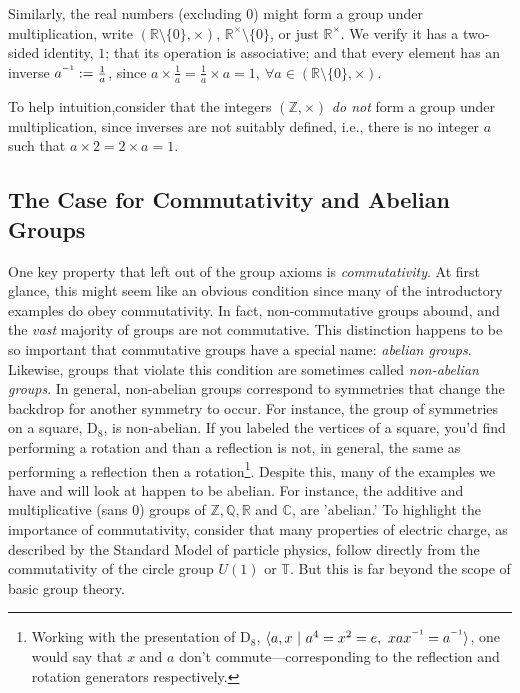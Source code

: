 \documentclass[11pt, a4paper]{report}
\newcommand{\inv}{^{\raisebox{.2em}{$\scriptscriptstyle-1$}}}
\newcommand{\integers}{\mathbb{Z}}
\newcommand{\rationals}{\mathbb{Q}}
\newcommand{\reals}{\mathbb{R}}
\newcommand{\complexes}{\mathbb{C}}
\begin{document}
 Similarly, the real numbers (excluding 0) might form a group under multiplication, write $(\reals\setminus\lbrace 0 \rbrace, \times)$, $\reals^{\times}\setminus\lbrace 0 \rbrace$, or just $\reals^{\times}$. 
We verify it has a two-sided identity, $1$; that its operation is associative; and that every element has an inverse $a\inv := \frac{1}{a}$, since $a\times \frac{1}{a} = \frac{1}{a} \times a = 1, \ \forall  a \in  (\reals\setminus\lbrace 0 \rbrace, \times)$. 
 
 To help intuition,consider that the integers $(\mathbb{Z},\times)$  \textit{do not} form a group under multiplication, since inverses are not suitably defined, i.e., there is no integer $a$ such that $a\times 2 = 2 \times a = 1$.

\subsection{The Case for Commutativity and Abelian Groups}
One key property that left out of the group axioms is \textit{commutativity}. At first glance, this might seem like an obvious condition since many of the introductory examples do obey commutativity. In fact, non-commutative groups abound, and the \textit{vast} majority of groups are not commutative.\autocite{aschbacher} This distinction happens to be so important that commutative groups have a special name: \textit{abelian groups}.\autocite[17]{dummit} Likewise, groups that violate this condition are sometimes called \textit{non-abelian groups}. In general, non-abelian groups correspond to symmetries that change the backdrop for another symmetry to occur. For instance, the group of symmetries on a square, $\mathrm{D}_{8}$, is non-abelian. If you labeled the vertices of a square, you'd find performing a rotation and than a reflection is not, in general, the same as performing a reflection then a rotation\footnote{Working with the presentation of $\mathrm{D}_8$, $\langle a,x\ \vert \ a^4 = x^2 = e,\ xax\inv = a\inv \rangle$, one would say that $x$ and $a$ don't commute—corresponding to the reflection and rotation generators respectively.}. Despite this, many of the examples we have and will look at happen to be abelian. For instance, the additive and multiplicative (sans $0$) groups of $\integers, \rationals, \reals$ and $\complexes$, are  'abelian.' To highlight the importance of commutativity, consider that many properties of electric charge, as described by the Standard Model of particle physics, follow directly from the commutativity of the circle group $U(1)$ or $\mathbb{T}$.\autocite{weinberg} But this is far beyond the scope of basic group theory.
\end{document}
